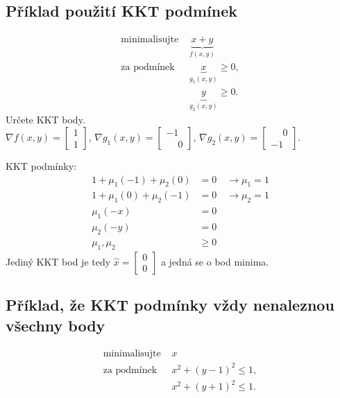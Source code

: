 \subsection{Příklad použití KKT podmínek}
\begin{align*}
    \text{minimalisujte } &\underbrace{x + y}_{f(x,y)} \\
    \text{za podmínek } &\underbrace{x}_{g_1(x,y)} \geq 0, \\
    &\underbrace{y}_{g_2(x,y)} \geq 0.
\end{align*}
Určete KKT body.\\
$\nabla f(x, y) = 
\begin{bmatrix}
    1 \\
    1
\end{bmatrix}$, $\nabla g_1(x,y) = 
\begin{bmatrix}
    -1 \\
    \phantom{-}0
\end{bmatrix}$, $\nabla g_2(x,y) = 
\begin{bmatrix}
    \phantom{-}0 \\
    -1
\end{bmatrix}$.

KKT podmínky:
\begin{align*}
    1 + \mu_1 (-1) + \mu_2 (0)  &= 0 \quad \rightarrow \mu_1 = 1 \\
    1 + \mu_1 (0) +  \mu_2 (-1) &= 0 \quad \rightarrow \mu_2 = 1 \\
    \mu_1 (-x) &= 0 \\
    \mu_2 (-y) &= 0 \\
    \mu_1, \mu_2 &\geq 0
\end{align*}
Jediný KKT bod je tedy 
$\hat x = \begin{bmatrix}
    0 \\
    0
\end{bmatrix}$ a jedná se o bod minima.

\subsection{Příklad, že KKT podmínky vždy nenaleznou všechny body}
\begin{align*}
    \text{minimalisujte } &x \\
    \text{za podmínek } &x^2 + (y-1)^2 \leq 1, \\
    &x^2 + (y+1)^2 \leq 1.
\end{align*}


